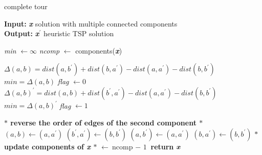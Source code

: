    \noindent
    
    \begin{algorithm}[H]
    \caption{complete tour}\label{complete tour}
    \hspace*{\algorithmicindent} \textbf{Input:} \textbf{\textit{x}} solution with multiple connected components \\ 
    \hspace*{\algorithmicindent} \textbf{Output:} \textbf{\textit{x}$^{\prime}$} heuristic TSP solution
    \begin{algorithmic}[1]
    \State \textit{min} $\gets \infty$
    \State \textit{ncomp} $\gets $ components(\textbf{\textit{x}})
    
	
	\State $\Delta(a,b) = dist(a, b^{\prime}) + dist(b, a^{\prime}) - dist(a, a^{\prime}) - dist(b, b^{\prime})$
	\State $ min = \Delta(a,b) $
	\State \textit{flag} $\gets 0$
	\EndIf 
	\State $\Delta(a,b)^{\prime} = dist(a, b) + dist(b^{\prime}, a^{\prime}) - dist(a, a^{\prime}) - dist(b, b^{\prime})$
	\State $ min = \Delta(a,b)^{\prime} $
	\State \textit{flag} $\gets 1$
	\EndIf 
	\EndIf 
    \EndFor
    	\end{algorithmic}
	\label{alg:completetouralg}
   	\end{algorithm}
	\noindent
	\begin{algorithm}                   
   	 \begin{algorithmic} [1]              
    \State \textbf{$\ast$ reverse the order of edges of the second component $\ast$ }
    \State $ (a, b) \gets (a, a^{\prime})$
    \State $ (b^{\prime}, a^{\prime}) \gets (b, b^{\prime})$
    \EndIf 
    \State $ (a, b^{\prime}) \gets (a, a^{\prime})$
    \State $ (b, a^{\prime}) \gets (b, b^{\prime})$
    \EndIf 
    \State \textbf{$\ast$ update components of \textbf{\textit{x}} $\ast$ }
    \State {} $\gets \text{ncomp $-$ 1} $    
    \EndWhile
    \State \textbf{return} $ \textbf{\textit{x}} $
    \end{algorithmic}
    \end{algorithm}

